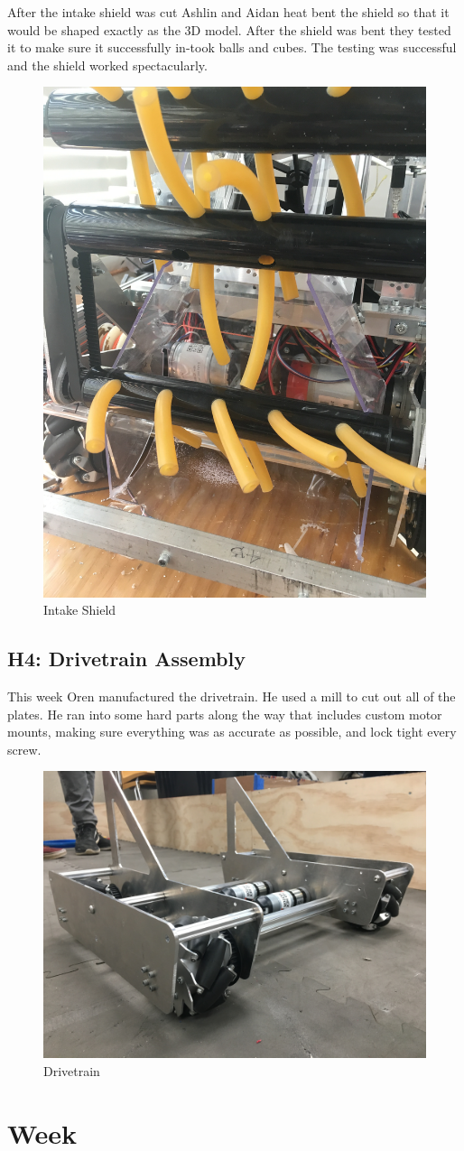 \documentclass{article}
\begin{document}
After the intake shield was cut Ashlin and Aidan heat bent the shield so that it would be shaped exactly as the 3D model. After the shield was bent they tested it to make sure it successfully in-took balls and cubes. The testing was successful and the shield worked  spectacularly.

\begin{figure}
    \centering
    \includegraphics[width=.6\textwidth, angle=270]{10_11-05/images/intake_shield.JPG}
    \caption{Intake Shield}
    \label{fig:Intake Shield}
\end{figure}

\subsection{H4: Drivetrain Assembly}

This week Oren manufactured the drivetrain. He used a mill to cut out all of the plates. He ran into some hard parts along the way that includes custom motor mounts, making sure everything was as accurate as possible, and lock tight every screw.

\begin{figure}
    \centering
    \includegraphics[width=.6 \textwidth]{10_11-05/images/drivetrain.JPG}
    \caption{Drivetrain}
    \label{fig:drivetrain}
\end{figure}
\clearpage \newpage \section{Week \thesection} 
\end{document}
